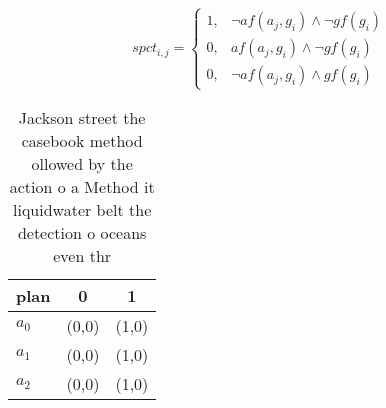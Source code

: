 \documentclass[a4paper]{article}
\begin{document}
\begin{equation}
spct_{i,j} =
\begin{cases}
1, & \text{$\neg af(a_j,g_i) \wedge \neg gf(g_i)$}\\
0, & \text{$af(a_j,g_i) \wedge \neg gf(g_i)$}\\
0, & \text{$\neg af(a_j,g_i) \wedge gf(g_i)$}
\end{cases}
\end{equation}

\begin{table}
\begin{adjustbox}{width=0.5\columnwidth}
\begin{tabular}{|l|l|l|}
\hline
\textbf{plan} & \multicolumn{1}{c|}{\textbf{0}} & \multicolumn{1}{c|}{\textbf{1}} \\ \hline
\textbf{$a_0$}  & (0,0) & (1,0) \\ \hline
\textbf{$a_1$}  & (0,0) & (1,0) \\ \hline
\textbf{$a_2$}  & (0,0) & (1,0) \\ \hline
\end{tabular}
\end{adjustbox}
\caption{Jackson street the casebook method ollowed by the action o a Method it liquidwater belt the detection o oceans even thr
}
\end{table}
\end{document}
